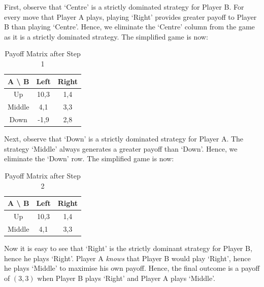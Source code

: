 \documentclass{article}
\theoremstyle{definition}
\begin{document}
\begin{steps}
    \item First, observe that `Centre' is a strictly dominated strategy for Player B. For every move that Player A plays, playing `Right' provides greater payoff to Player B than playing `Centre'. Hence, we eliminate the `Centre' column from the game as it is a strictly dominated strategy. The simplified game is now: \medskip
    \begin{table}[H]
    \begin{adjustbox}{width=5cm,height=1.2cm,center}
    \begin{tabular}{|c|c|c|}
        \hline
        A \textbackslash \: B & Left & Right \\
        \hline
        Up & 10,3 & 1,4 \\
        \hline 
        Middle & 4,1 & 3,3 \\
        \hline
        Down & -1,9 & 2,8\\
        \hline
    \end{tabular}
    \end{adjustbox}
    \caption{Payoff Matrix after Step 1}
    \label{table:iesds_step1}
    \end{table}
    
    \item Next, observe that `Down' is a strictly dominated strategy for Player A. The strategy `Middle' always generates a greater payoff than `Down'. Hence, we eliminate the `Down' row. The simplified game is now: \medskip
    \begin{table}[H]
    \begin{adjustbox}{width=5cm,center}
    \begin{tabular}{|c|c|c|}
        \hline
        A \textbackslash \: B & Left & Right \\
        \hline
        Up & 10,3 & 1,4 \\
        \hline 
        Middle & 4,1 & 3,3 \\
        \hline
    \end{tabular}
    \end{adjustbox}
    \caption{Payoff Matrix after Step 2}
    \label{table:iesds_step2}
    \end{table}
    
    \item Now it is easy to see that `Right' is the strictly dominant strategy for Player B, hence he plays `Right'. Player A \textit{knows} that Player B would play `Right', hence he plays `Middle' to maximise his own payoff. Hence, the final outcome is a payoff of $(3,3)$ when Player B plays `Right' and Player A plays `Middle'. 
    
\end{steps}
\end{document}
